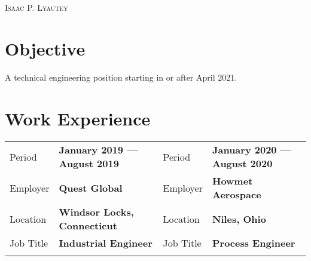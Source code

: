 \documentclass[a4paper, oneside, final, 10pt]{scrartcl} %
\newcommand{\gray}{\rowcolor[gray]{.90}} %
\begin{document}

\begin{center} %


{\fontsize{36}{36}\selectfont\scshape Isaac P. Lyautey}


\section{Objective}
\begin{center}
    A technical engineering position starting in or after April 2021.
\end{center}



\section{Work Experience}

\begin{tabularx}{0.97\linewidth}{XX|XX}
    \gray{}Period    & \textbf{January 2019 --- August 2019} & Period & \textbf{January 2020 --- August 2020}\\
    \gray{}Employer  & \textbf{Quest Global}                 & Employer & \textbf{Howmet Aerospace} \\
    \gray{}Location  & \textbf{Windsor Locks, Connecticut}   & Location & \textbf{Niles, Ohio}\\
    \gray{}Job Title & \textbf{Industrial Engineer}          & Job Title & \textbf{Process Engineer}\\
    \vspace{-10pt}
\end{tabularx}


\end{center}
\end{document}
